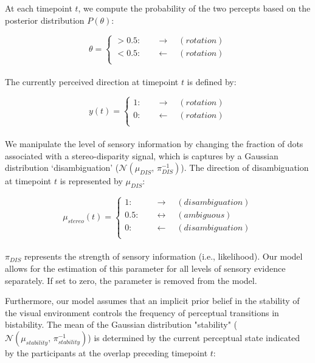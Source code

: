 \documentclass[12pt]{article}
\begin{document}
At each timepoint $t$, we compute the probability of the two percepts based on the posterior distribution $P(\theta)$:

\begin{equation}
\theta = 
\begin{cases}
>0.5:& \quad \rightarrow \quad (rotation) \\
<0.5:&  \quad \leftarrow \quad (rotation) \\
\end{cases}
\end{equation} \\

The currently perceived direction at timepoint $t$ is defined by:

\begin{equation}
y(t) = 
\begin{cases}
1:& \quad \rightarrow \quad (rotation) \\
0:&  \quad \leftarrow \quad (rotation) \\
\end{cases}
\end{equation} \\

We manipulate the level of sensory information by changing the fraction of dots associated with a stereo-disparity signal, which is captures by a Gaussian distribution ‘disambiguation’ ($\mathcal{N}(\mu_{DIS},\,\pi_{DIS}^{-1})$). The direction of disambiguation at timepoint $t$ is represented by $\mu_{DIS}$:

\begin{equation}
\mu_{stereo}(t) =
\begin{cases}
1:& \quad \rightarrow \quad (disambiguation) \\
0.5:&  \quad \leftrightarrow \quad (ambiguous) \\
0:&  \quad \leftarrow \quad (disambiguation) \\
\end{cases}
\end{equation}\\

$\pi_{DIS}$ represents the strength of sensory information (i.e., likelihood). Our model allows for the estimation of this parameter for all levels of sensory evidence separately. If set to zero, the parameter is removed from the model. 

Furthermore, our model assumes that an implicit prior belief in the stability of the visual environment controls the frequency of perceptual transitions in bistability. The mean of the Gaussian distribution "stability" ($\mathcal{N}(\mu_{stability},\,\pi_{stability}^{-1})$) is determined by the current perceptual state indicated by the participants at the overlap preceding timepoint $t$:
\end{document}
